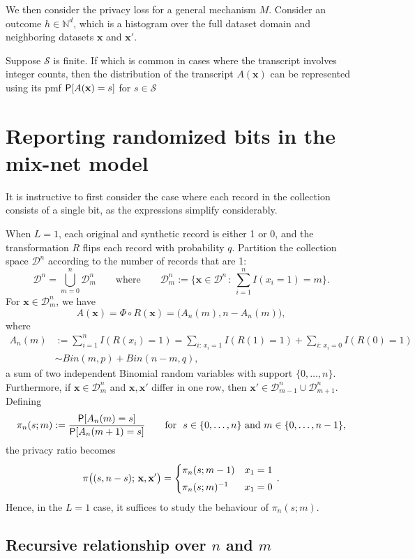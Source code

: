 \documentclass[11pt]{article}
\newcommand{\bbx}{\pmb{x}}
\newcommand{\N}{\mathbb{N}}
\newcommand{\Dsp}{\mathcal{D}}
\newcommand{\Ssp}{\mathcal{S}}
\newcommand{\xv}{\mathbf{x}}
\begin{document}
We then consider the privacy loss for a general mechanism $M$. Consider an outcome $h \in \N^d$, which is a histogram over the full dataset domain and neighboring datasets $\bbx$ and $\bbx'$.


Suppose $\Ssp$ is finite.  
If  which is common in cases where the transcript involves integer counts, then the distribution of the transcript $A(\xv)$ can be represented using its pmf $\P[A(\xv) = s]$ for $s \in \Ssp$




\section{Reporting randomized bits in the mix-net model}

It is instructive to first consider the case where each record in the collection consists of a single bit, as the expressions simplify considerably.

When $L=1$, each original and synthetic record is either 1 or 0, and the transformation $R$ flips each record with probability $q$.
Partition the collection space $\Dsp^n$ according to the number of records that are 1:
\[ \Dsp^n = \bigcup_{m = 0}^n \Dsp_m^n
\quad\quad\text{where}\quad\quad
\Dsp_m^n := \bigg\{ \xv\in\Dsp^n \,:\, \sum_{i=1}^n I(x_i = 1) = m \bigg\}.
\]
For $\xv\in\Dsp_m^n$, we have
\[ A(\xv) = \Phi\circ R(\xv) = \big(A_n(m), n - A_n(m)\big), \]
where
\begin{align*}
A_n(m) &:= \sum_{i=1}^n I(R(x_i) = 1)
= \sum_{i:\, x_i = 1} I(R(1) = 1) + \sum_{i:\, x_i = 0} I(R(0) = 1) \\
&\sim Bin(m, p) + Bin(n-m, q),
\end{align*}
a sum of two independent Binomial random variables with support $\{0,\dots,n\}$.
Furthermore, if $\xv\in\Dsp_m^n$ and $\xv,\xv'$ differ in one row, then $\xv'\in\Dsp_{m-1}^n \cup \Dsp_{m+1}^n$.
Defining
\[ \pi_n(s; m) := \frac{\P[A_n(m) = s]}{\P[A_n(m+1) = s]}
\quad\quad\text{for}\ \ 
s\in\{0,\dots,n\}\ \text{and}\ m\in\{0,\dots,n-1\},
\]
the privacy ratio becomes
\[ \pi\big((s, n-s);\,\xv,\xv'\big) =
\begin{cases}
\pi_n(s;m - 1) & x_1 = 1 \\[0.3em]
\inv{\pi_n(s;m)} & x_1 = 0
\end{cases}\, .
\]
Hence, in the $L=1$ case, it suffices to study the behaviour of $\pi_n(s;m)$.


\subsection{Recursive relationship over $n$ and $m$}
\end{document}
